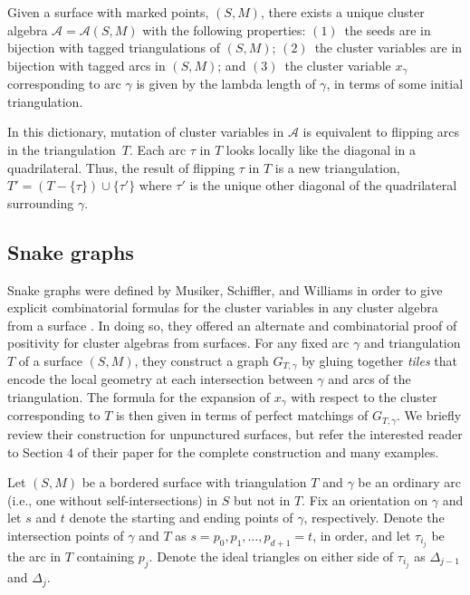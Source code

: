 \begin{Theorem}\label{SurfaceCA}
Given a surface with marked points, $(S,M)$, there exists a unique cluster algebra $\mathcal{A} = \mathcal{A}(S,M)$ with the following properties: $(1)$~the seeds are in bijection with tagged triangulations of $(S,M)$;
$(2)$~the cluster variables are in bijection with tagged arcs in $(S,M)$; and $(3)$~the cluster variable $x_\gamma$ corresponding to arc $\gamma$ is given by the lambda length of $\gamma$, in terms of some initial triangulation.
\end{Theorem}
 In this dictionary, mutation of cluster variables in $\mathcal{A}$ is equivalent to flipping arcs in the triangulation~$T$. Each arc $\tau$ in $T$ looks locally like the diagonal in a quadrilateral. Thus, the result of flipping $\tau$ in $T$ is a new triangulation, $T' = (T - \{\tau\}) \cup \{\tau' \}$ where $\tau'$ is the unique other diagonal of the quadrilateral surrounding $\gamma$.

\subsection{Snake graphs}\label{section:snakeGraphs}

Snake graphs were defined by Musiker, Schiffler, and Williams in order to give explicit combinatorial formulas for the cluster variables in any cluster algebra from a surface \cite{MSW}. In doing so, they offered an alternate and combinatorial proof of positivity for cluster algebras from surfaces. For any fixed arc $\gamma$ and triangulation $T$ of a surface $(S,M)$, they construct a graph $G_{T,\gamma}$ by gluing together \emph{tiles} that encode the local geometry at each intersection between $\gamma$ and arcs of the triangulation. The formula for the expansion of $x_\gamma$ with respect to the cluster corresponding to $T$ is then given in terms of perfect matchings of $G_{T,\gamma}$. We briefly review their construction for unpunctured surfaces, but refer the interested reader to Section 4 of their paper for the complete construction and many examples.

Let $(S,M)$ be a bordered surface with triangulation $T$ and $\gamma$ be an ordinary arc (i.e., one without self-intersections) in $S$ but not in $T$. Fix an orientation on $\gamma$ and let $s$ and $t$ denote the starting and ending points of $\gamma$, respectively. Denote the intersection points of $\gamma$ and $T$ as $s = p_0, p_1, \dots, p_{d+1} = t$, in order, and let $\tau_{i_j}$ be the arc in $T$ containing $p_j$. Denote the ideal triangles on either side of $\tau_{i_j}$ as $\Delta_{j-1}$ and $\Delta_j$.

